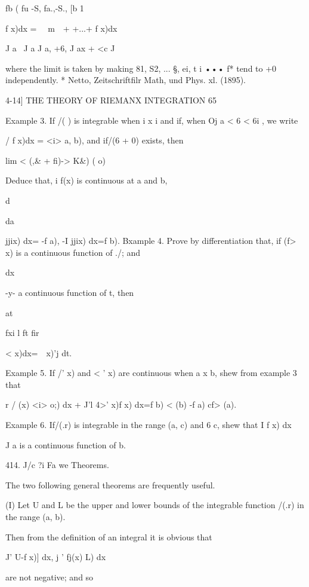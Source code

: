 fb ( fu -S, fa.,-S., [b 1

f x)dx = \ \ m\ \ + +...+ f x)dx\,

J a \ J a J a, +6, J ax + <c J

where the limit is taken by making 81, S2, ... §, ei, t i ••• f* tend
to +0 independently. * Netto, Zeitschriftfilr Math, und Phys. xl.
(1895).



4-14] THE THEORY OF RIEMANX INTEGRATION 65

Example 3. If /( ) is integrable when i x i and if, when Oj a < 6 < 6i
, we write

/ f x)dx = <i> a, b), and if/(6 + 0) exists, then



lim < (,\& + fi)-> K\&) ( o)

Deduce that, i f(x) is continuous at a and b,

d\

da



jjix) dx= -f a), -I jjix) dx=f b). Bxample 4. Prove by differentiation
that, if (f> x) is a continuous function of ./; and



dx

-y- a continuous function of t, then

at



fxi l ft fir

 < x)dx=\ \ x)'j dt.



Example 5. If /' x) and < ' x) are continuous when a x b, shew from
example 3 that

r / (x) <i> o;) dx + J'l 4>' x)f x) dx=f b) < (b) -f a) cf> (a).

Example 6. If/(.r) is integrable in the range (a, c) and 6 c, shew
that I f x) dx

J a is a continuous function of b.

414. J/c ?i Fa we Theorems.

The two following general theorems are frequently useful.

(I) Let U and L be the upper and lower bounds of the integrable
function /(.r) in the range (a, b).

Then from the definition of an integral it is obvious that

J' U-f x)] dx, j ' fj(x) L) dx

are not negative; and so

